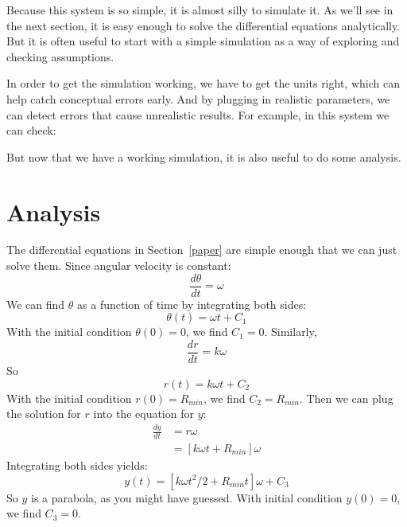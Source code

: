 \documentclass[12pt]{book}
\theoremstyle{exercise}
\newcommand{\py}{\verb}%}
\begin{document}
Because this system is so simple, it is almost silly to simulate it.  As we'll see in the next section, it is easy enough to solve the differential equations analytically.  But it is often useful to start with a simple simulation as a way of exploring and checking assumptions.

In order to get the simulation working, we have to get the units right, which can help catch conceptual errors early.  And by plugging in realistic parameters, we can detect errors that cause unrealistic results.  For example, in this system we can check:


But now that we have a working simulation, it is also useful to do some analysis.


\section{Analysis}
\label{paper_analysis}

The differential equations in Section~\ref{paper} are simple enough that we can just solve them.  Since angular velocity is constant:
%
\[ \frac{d\theta}{dt} = \omega  \]
%
We can find $\theta$ as a function of time by integrating both sides:
%
\[ \theta(t) = \omega t + C_1 \]
%
With the initial condition $\theta(0)=0$,  we find $C_1=0$.  Similarly,
%
\begin{equation}
\frac{dr}{dt} = k \omega                    \label{eqn1}
\end{equation}
%
So
%
\[ r(t) = k \omega t + C_2 \]
%
With the initial condition $r(0)=R_{min}$,  we find $C_2=R_{min}$.  Then we can plug the solution for $r$ into the equation for $y$:
%
\begin{align}
\frac{dy}{dt} & = r \omega                    \label{eqn2}   \\
              & = \left[ k \omega t + R_{min} \right] \omega \nonumber
\end{align}
%
%
Integrating both sides yields:
%
\[ y(t) = \left[ k \omega t^2 / 2 + R_{min} t \right] \omega + C_3\]
%
So $y$ is a parabola, as you might have guessed.  With initial condition $y(0)=0$, we find $C_3=0$.
\end{document}
